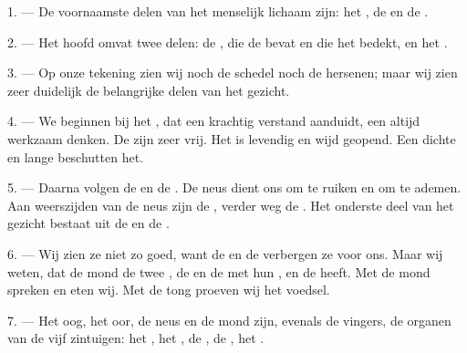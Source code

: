 
\VUsaut{4.0mm}
\VUsaut{2.0mm}

\VUsaut{2.4mm}
\VUsaut{3.0mm}

\VUsaut{3.0mm}

1. --- De voornaamste delen van het menselijk lichaam zijn: het
, de  en de .

2. --- Het hoofd omvat twee delen: de , die de
 bevat en die het  bedekt, en het
.

3. --- Op onze tekening zien wij noch de schedel noch de hersenen; maar wij zien zeer
duidelijk de belangrijke delen van het gezicht.

4. --- We beginnen bij het , dat een krachtig verstand aanduidt, een altijd
werkzaam denken. De  zijn zeer vrij. Het
 is levendig en wijd geopend. Een dichte  en lange
 beschutten het.

5. --- Daarna volgen de  en de . De neus dient ons om te ruiken
en om te ademen. Aan weerszijden van de neus zijn de
, verder weg de . Het onderste deel van het gezicht
bestaat uit de  en de .

6. --- Wij zien ze niet zo goed, want de  en de
 verbergen ze voor ons. Maar wij weten, dat de mond de
twee , de  en de  met hun
, en de  heeft. Met de mond spreken en eten wij. Met
de tong proeven wij het voedsel.

7. --- Het oog, het oor, de neus en de mond zijn, evenals de vingers, de organen van de vijf
zintuigen: het , het , de
, de , het .

